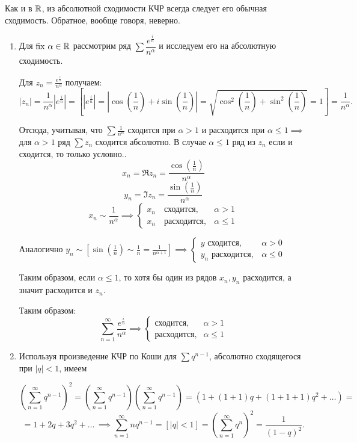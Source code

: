 \documentclass[../../main.tex]{subfiles}
\begin{document}
\begin{rem}
	Как и в $ \mathbb{R} $, из абсолютной сходимости КЧР всегда следует его обычная 
	сходимость. Обратное, вообще говоря, неверно.
\end{rem}

\begin{exmp}
	\;
	\begin{enumerate}
		\item Для $ \operatorname{fix}\, \alpha \in \mathbb{R} $ рассмотрим ряд $ \sum 
		\dfrac{e^{\frac{i}{n}}}{n^\alpha} $ и исследуем его на абсолютную сходимость.
		
		Для $ z_n = \frac{e^{\frac{i}{n}}}{n^\alpha}$ получаем: \[|z_n| = 
		\frac{1}{n^\alpha} |e^{\frac{i}{n}}| = \left[|e^{\frac{i}{n}}| = 
		\left|\cos\left(\frac{1}{n}\right) + i\sin\left(\frac{1}{n}\right)\right| = \sqrt{\cos^2\left(\frac{1}{n}\right) + 
		\sin^2\left(\frac{1}{n}\right)} = 1\right] = \frac{1}{n^\alpha}.\]
		
		Отсюда, учитывая, что $ \sum \frac{1}{n^\alpha} $ сходится при $ \alpha > 1 
		$ и расходится при $ \alpha \leq 1 \implies $ для $ \alpha > 1 $ ряд $
		\sum z_n $ сходится абсолютно. В случае $ \alpha \leq 1 $ ряд из $ z_n $ 
		если и сходится, то только условно..
		\[x_n = \Re z_n = \frac{\cos(\frac{1}{n})}{n^\alpha}\]
		\[y_n = \Im z_n = \frac{\sin(\frac{1}{n})}{n^\alpha}\]
		\[x_n \sim \frac{1}{n^\alpha} \implies 
		\begin{cases}
			x_n \quad \text{сходится}, &\alpha > 1 \\
			x_n \quad \text{расходится}, &\alpha \leq 1
		\end{cases}\]
		
		Аналогично $\displaystyle y_n \sim \left[\sin\left(\frac{1}{n}\right) \sim \frac{1}{n} = 
		\frac{1}{n^{\alpha + 1}}\right] \implies
		\begin{cases}
		y  \text{ сходится},& \alpha > 0 \\
		y_n  \text{ расходится},& \alpha \leq 0
		\end{cases} $
		
		Таким образом, если $ \alpha \leq 1 $, то хотя бы один из рядов $ x_n, y_n $ 
		расходится, а значит расходится и $ z_n $.
		
		Таким образом:
		\[ \sum_{n=1}^{\infty}\frac{e^{\frac{i}{n}}}{n^\alpha}\implies
		\begin{cases}
		\text{сходится},& \alpha > 1 \\
		\text{расходится},& \alpha \leq 1
		\end{cases}\]
		
	\item Используя произведение КЧР по Коши для $ \sum q^{n - 1} $, абсолютно 
	сходящегося при ${|q| < 1}$, имеем
	
	\[\left(\sum_{n=1}^{\infty}q^{n - 1}\right)^2 = \left(\sum_{n=1}^{\infty}q^{n - 
	1}\right)\left(\sum_{n=1}^{\infty}q^{n - 1}\right) = (1 + (1 + 1)q + (1 + 1 + 1)q^2 + \ldots ) = \]
	\[= 1 + 2q + 3q^2 + \ldots\, \implies
	\sum_{n=1}^{\infty}nq^{n - 1} = [|q| < 1] = \left(\sum_{n=1}^{\infty}q^{n}\right)^2 = 
	\frac{1}{(1 - q)^2}.\]
	\end{enumerate}
\end{exmp}
\end{document}
